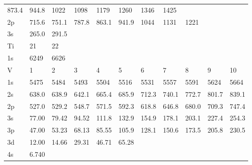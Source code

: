 \begin{table}
\begin{tabular}{lllllllllll}
873.4& 944.8& 1022& 1098& 1179& 1260& 1346& 1425\\
2p& 715.6& 751.1& 787.8& 863.1&
941.9&  1044&  1131&  1221\\
3s& 265.0& 291.5\\
\hline
Ti& 21&  22\\
\hline
1s&  6249&  6626\\
\hline
V&  1&   2& 3&   4&   5&   6&   7&   8&   9&  10\\
\hline
1s&  5475&  5484&  5493&  5504&  5516&  5531&  5557&
5591&  5624&  5664\\
2s& 638.0& 638.9& 642.1& 665.4& 685.9& 712.3& 740.1& 772.7& 801.7&
839.1\\
2p& 527.0& 529.2& 548.7& 571.5& 592.3& 618.8& 646.8& 680.0& 709.3& 747.4\\
3s& 77.00&
79.42& 94.52& 111.8& 132.9& 154.9& 178.1& 203.1& 227.4& 254.3\\
3p& 47.00& 53.23& 68.13&
85.55& 105.9& 128.1& 150.6& 173.5& 205.8& 230.5\\
3d& 12.00& 14.66& 29.31& 46.71& 65.28\\
4s&
6.740\\
\hline
\end{tabular}
\end{table}
